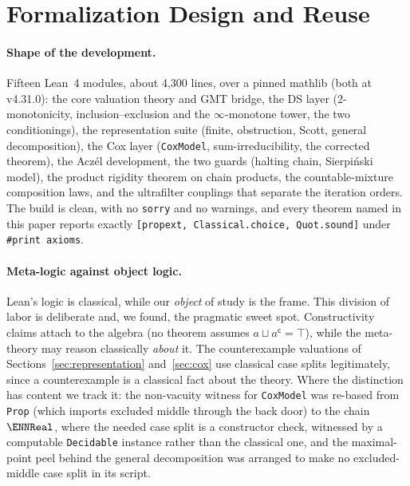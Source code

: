 \section{Formalization Design and Reuse}
\label{sec:engineering}

\paragraph{Shape of the development.}
Fifteen Lean~4 modules, about 4{,}300 lines, over a pinned
\textsf{mathlib} (both at v4.31.0): the core valuation theory and
GMT bridge, the DS layer (2-monotonicity, inclusion--exclusion and
the $\infty$-monotone tower, the two conditionings), the
representation suite (finite, obstruction, Scott, general
decomposition), the Cox layer (\texttt{CoxModel},
sum-irreducibility, the corrected theorem), the Acz\'el development,
the two guards (halting chain, Sierpi\'nski model), the product rigidity
theorem on chain products, the countable-mixture composition laws,
and the ultrafilter couplings that separate the iteration orders.
The build is clean, with no
\texttt{sorry} and no warnings, and every theorem named in this
paper reports exactly
\texttt{[propext, Classical.choice, Quot.sound]} under
\texttt{\#print axioms}.

\paragraph{Meta-logic against object logic.}
Lean's logic is classical, while our \emph{object} of study is the
frame.  This division of labor is deliberate and, we found, the
pragmatic sweet spot.  Constructivity claims attach to the algebra
(no theorem assumes $a \sqcup a^{\mathsf{c}} = \top$), while the
meta-theory may reason classically \emph{about} it.  The
counterexample valuations of Sections~\ref{sec:representation}
and~\ref{sec:cox} use classical case splits legitimately, since a
counterexample is a classical fact about the theory.  Where the
distinction has content we track it: the non-vacuity witness for
\texttt{CoxModel} was re-based from \texttt{Prop} (which imports
excluded middle through the back door) to the chain $\ENNReal$,
where the needed case split is a constructor check, witnessed by a
computable \texttt{Decidable} instance rather than the classical
one, and the maximal-point peel behind the general decomposition
was arranged to make no excluded-middle case split in its script.

